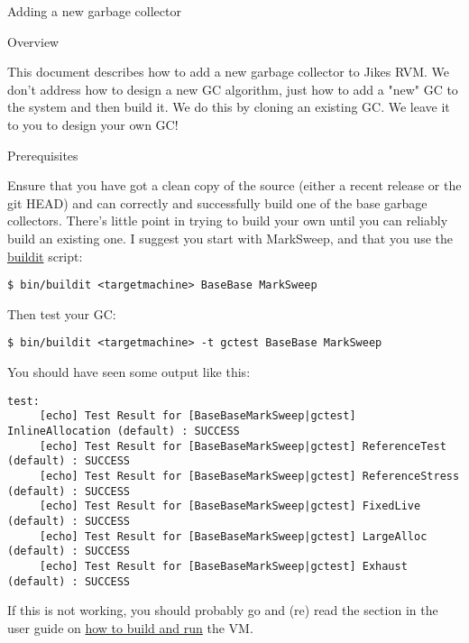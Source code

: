 \begin{section}{Adding a new garbage collector}
\label{sec:addinganewgarbagecollector}


\begin{subsection}{Overview}

This document describes how to add a new garbage collector to Jikes RVM.  We don't address how to design a new GC algorithm, just how to add a "new" GC to the system and then build it.  We do this by cloning an existing GC.  We leave it to you to design your own GC!

\end{subsection}

\begin{subsection}{Prerequisites}

Ensure that you have got a clean copy of the source (either a recent release or the git HEAD) and can correctly and successfully build one of the base garbage collectors.  There's little point in trying to build your own until you can reliably build an existing one.  I suggest you start with MarkSweep, and that you use the \hyperref[sec:usingbuildit]{buildit} script:

\begin{lstlisting}
$ bin/buildit <targetmachine> BaseBase MarkSweep
\end{lstlisting}

Then test your GC:

\begin{lstlisting}
$ bin/buildit <targetmachine> -t gctest BaseBase MarkSweep
\end{lstlisting}

You should have seen some output like this:

\begin{lstlisting}
test:
     [echo] Test Result for [BaseBaseMarkSweep|gctest] InlineAllocation (default) : SUCCESS
     [echo] Test Result for [BaseBaseMarkSweep|gctest] ReferenceTest (default) : SUCCESS
     [echo] Test Result for [BaseBaseMarkSweep|gctest] ReferenceStress (default) : SUCCESS
     [echo] Test Result for [BaseBaseMarkSweep|gctest] FixedLive (default) : SUCCESS
     [echo] Test Result for [BaseBaseMarkSweep|gctest] LargeAlloc (default) : SUCCESS
     [echo] Test Result for [BaseBaseMarkSweep|gctest] Exhaust (default) : SUCCESS  
\end{lstlisting}

If this is not working, you should probably go and (re) read the section in the user guide on \hyperref[part:careandfeeding]{how to build and run} the VM.


\end{subsection}
\end{section}

